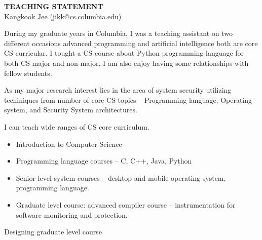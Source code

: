 \documentclass[letterpaper, 10pt]{article}
\begin{document}
\thispagestyle{fancy}

\lhead{}
\rhead{}

\renewcommand{\headrulewidth}{0pt} 
\renewcommand{\footrulewidth}{0pt} 
\fancyfoot[C]{\footnotesize \textcolor{gray}{http://www.cs.columbia.edu/$\sim$jikk/application}} 


\pagestyle{fancy}
\lhead{\textcolor{gray}{\it Kangkook Jee}}
\rhead{\textcolor{gray}{\thepage /\pageref{LastPage}}}

\begin{small}

\begin{center}
{\LARGE \bf TEACHING STATEMENT}\\
\vspace*{0.1cm}
{\normalsize Kangkook Jee (jikk@cs.columbia.edu)}
\end{center}

During my graduate years in Columbia, I was a teaching assistant on two
different occasions advanced programming and artificial intelligence both are
core CS curricular.
%
I tought a CS course about Python programming language for both CS major and
non-major.
%
I am also enjoy having some relationships with fellow students.
%

As my major research interest lies in the area of system security utilizing 
techiniques from number of core CS topics -- Programming language, Operating
system, and Security System architectures.

I can teach wide ranges of CS core curriculum.
\begin{itemize}
\item Introduction to Computer Science
\item Programming language courses -- C, C++, Java, Python 
\item Senior level system courses -- desktop and mobile operating system,
  programming language.
\item Graduate level course: advanced compiler course -- instrumentation for
  software monitoring and protection.
\end{itemize}

Designing graduate level course 

\end{small}
\end{document}
